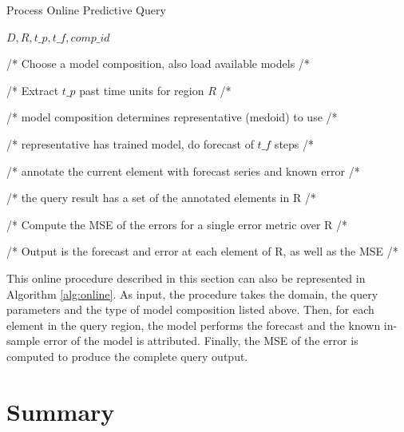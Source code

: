 \begin{algorithm}[h!]
\caption{Process Online Predictive Query}\label{alg:online}
\begin{algorithmic}[1] 
 {$D, R, t\_p, t\_f, comp\_id $}

/* Choose a model composition, also load available models /*

/* Extract $t\_p$ past time units for region $R$ /*



 /* model composition determines representative (medoid) to use /*
 
 /* representative has trained model, do forecast of $t\_f$ steps /*
 
 /* annotate the current element with forecast series and known error /*
 
 /* the query result has a set of the annotated elements in R /*
\EndFor

/* Compute the MSE of the errors for a single error metric over R /*

/* Output is the forecast and error at each element of R, as well as the MSE /* 
\EndFunction 
\end{algorithmic} 
\end{algorithm} 

This online procedure described in this section can also be represented in Algorithm \ref{alg:online}. As input, the procedure takes the domain, the query parameters and the type of model composition listed above. Then, for each element in the query region, the model performs the forecast and the known in-sample error of the model is attributed. Finally, the MSE of the error is computed to produce the complete query output.

\section{Summary}
\label{Sec:MethodologySummary}

